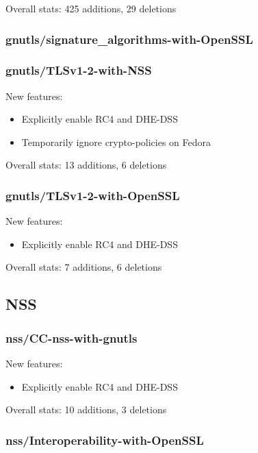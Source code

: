     Overall stats: 425 additions, 29 deletions

\subsubsection{gnutls/signature\_algorithms-with-OpenSSL}

\subsubsection{gnutls/TLSv1-2-with-NSS}
    New features:
    \begin{itemize}
        \item Explicitly enable RC4 and DHE-DSS
        \item Temporarily ignore crypto-policies on Fedora
    \end{itemize}

    Overall stats: 13 additions, 6 deletions

\subsubsection{gnutls/TLSv1-2-with-OpenSSL}
    New features:
    \begin{itemize}
        \item Explicitly enable RC4 and DHE-DSS
    \end{itemize}

    Overall stats: 7 additions, 6 deletions

\subsection{NSS}
\subsubsection{nss/CC-nss-with-gnutls}
    New features:
    \begin{itemize}
        \item Explicitly enable RC4 and DHE-DSS
    \end{itemize}

    Overall stats: 10 additions, 3 deletions

\subsubsection{nss/Interoperability-with-OpenSSL}

